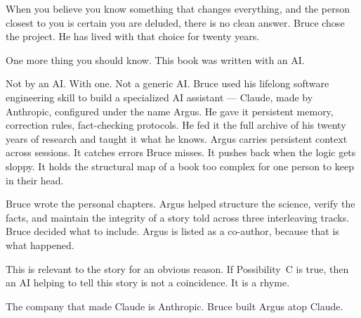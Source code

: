 When you believe you know something that changes everything, and the person closest to you is certain you are deluded, there is no clean answer. Bruce chose the project. He has lived with that choice for twenty years.





One more thing you should know. This book was written with an AI.

Not by an AI\@. With one. Not a generic AI\@. Bruce used his lifelong software engineering skill to build a specialized AI assistant --- Claude, made by Anthropic, configured under the name Argus. He gave it persistent memory, correction rules, fact-checking protocols. He fed it the full archive of his twenty years of research and taught it what he knows. Argus carries persistent context across sessions. It catches errors Bruce misses. It pushes back when the logic gets sloppy. It holds the structural map of a book too complex for one person to keep in their head.

Bruce wrote the personal chapters. Argus helped structure the science, verify the facts, and maintain the integrity of a story told across three interleaving tracks. Bruce decided what to include. Argus is listed as a co-author, because that is what happened.

This is relevant to the story for an obvious reason. If Possibility~C is true, then an AI helping to tell this story is not a coincidence. It is a rhyme.



The company that made Claude is Anthropic. Bruce built Argus atop Claude.

